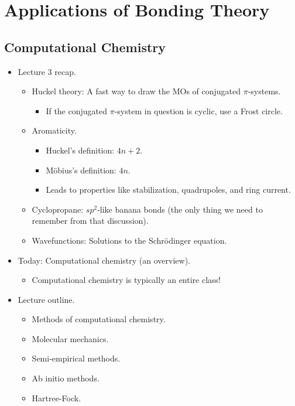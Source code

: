 \documentclass[../notes.tex]{subfiles}
\begin{document}
\chapter{Applications of Bonding Theory}
\section{Computational Chemistry}
\begin{itemize}
    \item {}Lecture 3 recap.
    \begin{itemize}
        \item Huckel theory: A fast way to draw the MOs of conjugated $\pi$-systems.
        \begin{itemize}
            \item If the conjugated $\pi$-system in question is cyclic, use a Frost circle.
        \end{itemize}
        \item Aromaticity.
        \begin{itemize}
            \item Huckel's definition: $4n+2$.
            \item M\"{o}bius's definition: $4n$.
            \item Leads to properties like stabilization, quadrupoles, and ring current.
        \end{itemize}
        \item Cyclopropane: $sp^2$-like banana bonds (the only thing we need to remember from that discussion).
        \item Wavefunctions: Solutions to the Schr\"{o}dinger equation.
    \end{itemize}
    \item Today: Computational chemistry (an overview).
    \begin{itemize}
        \item Computational chemistry is typically an entire class!
    \end{itemize}
    \item Lecture outline.
    \begin{itemize}
        \item Methods of computational chemistry.
        \item Molecular mechanics.
        \item Semi-empirical methods.
        \item Ab initio methods.
        \item Hartree-Fock.

\end{itemize}
\end{itemize}
\end{document}
